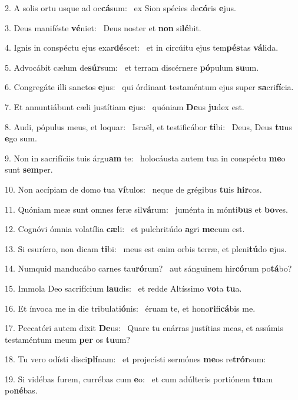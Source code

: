 2. A solis ortu usque ad oc\textbf{cá}sum: \ast\  ex Sion spécies de\textbf{có}ris \textbf{e}jus.\

3. Deus maniféste \textbf{vé}niet: \ast\  Deus noster et \textbf{non} si\textbf{lé}bit.\

4. Ignis in conspéctu ejus exar\textbf{dé}scet: \ast\  et in circúitu ejus tem\textbf{pés}tas \textbf{vá}lida.\

5. Advocábit cælum de\textbf{súr}sum: \ast\  et terram discérnere \textbf{pó}pulum \textbf{su}um.\

6. Congregáte illi sanctos \textbf{e}jus: \ast\  qui órdinant testaméntum ejus super \textbf{sa}cri\textbf{fí}cia.\

7. Et annuntiábunt cæli justítiam \textbf{e}jus: \ast\  quóniam \textbf{De}us \textbf{ju}dex est.\

8. Audi, pópulus meus, et loquar: \dag\  Israël, et testificábor \textbf{ti}bi: \ast\  Deus, Deus \textbf{tu}us \textbf{e}go sum.\

9. Non in sacrifíciis tuis árgu\textbf{am} te: \ast\  holocáusta autem tua in conspéctu \textbf{me}o sunt \textbf{sem}per.\

10. Non accípiam de domo tua \textbf{ví}tulos: \ast\  neque de grégibus \textbf{tu}is \textbf{hir}cos.\

11. Quóniam meæ sunt omnes feræ sil\textbf{vá}rum: \ast\  juménta in mónti\textbf{bus} et \textbf{bo}ves.\

12. Cognóvi ómnia volatília \textbf{cæ}li: \ast\  et pulchritúdo \textbf{a}gri \textbf{me}cum est.\

13. Si esuríero, non dicam \textbf{ti}bi: \ast\  meus est enim orbis terræ, et pleni\textbf{tú}do \textbf{e}jus.\

14. Numquid manducábo carnes tau\textbf{ró}rum? \ast\  aut sánguinem hir\textbf{có}rum po\textbf{tá}bo?\

15. Immola Deo sacrifícium \textbf{lau}dis: \ast\  et redde Altíssimo \textbf{vo}ta \textbf{tu}a.\

16. Et ínvoca me in die tribulati\textbf{ó}nis: \ast\  éruam te, et hono\textbf{ri}fi\textbf{cá}bis me.\

17. Peccatóri autem dixit \textbf{De}us: \ast\  Quare tu enárras justítias meas, et assúmis testaméntum meum \textbf{per} os \textbf{tu}um?\

18. Tu vero odísti disci\textbf{plí}nam: \ast\  et projecísti sermónes \textbf{me}os re\textbf{trór}sum:\

19. Si vidébas furem, currébas cum \textbf{e}o: \ast\  et cum adúlteris portiónem \textbf{tu}am po\textbf{né}bas.\

